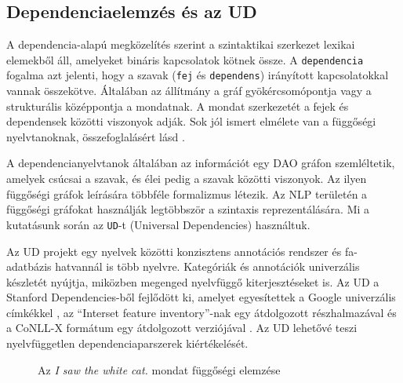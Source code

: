 \subsection{Dependenciaelemzés és az UD}
\label{sec:ud}
A dependencia-alapú megközelítés szerint a szintaktikai szerkezet lexikai elemekből áll, amelyeket bináris kapcsolatok kötnek össze. A \texttt{dependencia} fogalma azt jelenti, hogy a szavak (\texttt{fej} és \texttt{dependens}) irányított kapcsolatokkal vannak összekötve.  Általában az állítmány a gráf gyökércsomópontja vagy a strukturális középpontja a mondatnak. A mondat szerkezetét a fejek és dependensek közötti viszonyok adják. Sok jól ismert elmélete van a függőségi nyelvtanoknak, összefoglalásért lásd \cite{Nivre:2005}.

A dependencianyelvtanok általában az információt egy DAO gráfon szemléltetik, amelyek csúcsai a szavak, és élei pedig a szavak közötti viszonyok. Az ilyen függőségi gráfok leírására többféle formalizmus létezik. Az NLP területén a függőségi gráfokat használják legtöbbször a szintaxis reprezentálására. Mi a kutatásunk során az \texttt{UD}-t (Universal Dependencies)\cite{deMarneffe:2014} használtuk.

Az UD projekt egy nyelvek közötti konzisztens annotációs rendszer és fa-adatbázis hatvannál is több nyelvre. Kategóriák és annotációk univerzális készletét nyújtja, miközben megenged nyelvfüggő kiterjesztéseket is. Az UD a Stanford Dependencies-ből \cite{deMarneffe:2008} fejlődött ki, amelyet egyesítettek a Google univerzális címkékkel \cite{Petrov:2011}, az “Interset feature inventory”-nak egy átdolgozott részhalmazával \cite{Zeman:2008} és  a CoNLL-X formátum egy átdolgozott verziójával \cite{Buchholz:2006}. Az UD lehetővé teszi nyelvfüggetlen dependenciaparszerek kiértékelését.

\begin{figure}[h]
\centering 
{}
\caption{Az \textit{I saw the white cat.} mondat függőségi elemzése}
\label{fig:deptreeEN}  
\end{figure}

